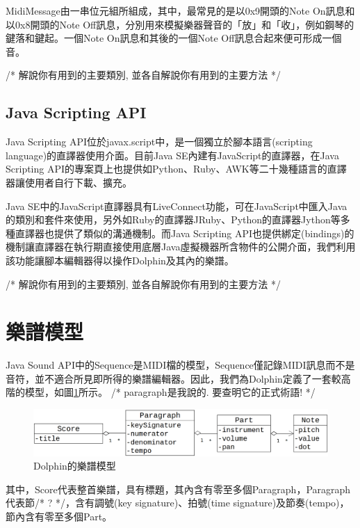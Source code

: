 \documentclass[12pt,a4paper,oneside]{report}
\begin{document}
MidiMessage由一串位元組所組成，其中，最常見的是以0x9開頭的Note On訊息和以0x8開頭的Note Off訊息，分別用來模擬樂器聲音的「放」和「收」，例如鋼琴的鍵落和鍵起。一個Note On訊息和其後的一個Note Off訊息合起來便可形成一個音。

/*
     解說你有用到的主要類別, 並各自解說你有用到的主要方法
*/

\subsection{Java Scripting API}

Java Scripting API位於javax.script中，是一個獨立於腳本語言(scripting language)的直譯器使用介面。目前Java SE內建有JavaScript的直譯器，在Java Scripting API的專案頁上也提供如Python、Ruby、AWK等二十幾種語言的直譯器讓使用者自行下載、擴充。

Java SE中的JavaScript直譯器具有LiveConnect功能，可在JavaScript中匯入Java的類別和套件來使用，另外如Ruby的直譯器JRuby、Python的直譯器Jython等多種直譯器也提供了類似的溝通機制。而Java Scripting API也提供綁定(bindings)的機制讓直譯器在執行期直接使用底層Java虛擬機器所含物件的公開介面，我們利用該功能讓腳本編輯器得以操作Dolphin及其內的樂譜。

/*
     解說你有用到的主要類別, 並各自解說你有用到的主要方法
*/


\section{樂譜模型}

Java Sound API中的Sequence是MIDI檔的模型，Sequence僅記錄MIDI訊息而不是音符，並不適合所見即所得的樂譜編輯器。因此，我們為Dolphin定義了一套較高階的模型，如圖\ref{fig:model}所示。 /* paragraph是我說的. 要查明它的正式術語! */



\begin{figure}[htb]
\centering
\includegraphics[scale=0.1]{img/model.png}
\caption{ Dolphin的樂譜模型}
\label{fig:model}
\end{figure}

其中，Score代表整首樂譜，具有標題，其內含有零至多個Paragraph，Paragraph代表節/* ? */，含有調號(key signature)、拍號(time signature)及節奏(tempo)，節內含有零至多個Part。
\end{document}
